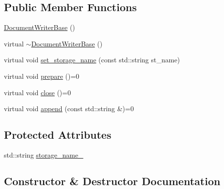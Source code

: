 \subsection*{Public Member Functions}
\begin{DoxyCompactItemize}
\item 
\hyperlink{classGraphicalEditorCore_1_1DocumentWriterBase_af988c894677d39d1544a9b978c327353}{Document\+Writer\+Base} ()
\item 
virtual \hyperlink{classGraphicalEditorCore_1_1DocumentWriterBase_ade9be8e2ae6676e92f6c56cfe1acad11}{$\sim$\+Document\+Writer\+Base} ()
\item 
virtual void \hyperlink{classGraphicalEditorCore_1_1DocumentWriterBase_a225cef356ae9d25a580c5065d5a70a2d}{set\+\_\+storage\+\_\+name} (const std\+::string st\+\_\+name)
\item 
virtual void \hyperlink{classGraphicalEditorCore_1_1DocumentWriterBase_a6ce62d6ccbe39b8c18532c183c6ef4de}{prepare} ()=0
\item 
virtual void \hyperlink{classGraphicalEditorCore_1_1DocumentWriterBase_a852099c87792d7b8a7edf1b4544cb073}{close} ()=0
\item 
virtual void \hyperlink{classGraphicalEditorCore_1_1DocumentWriterBase_a4afe0c1e911f8a6255215f20b372c436}{append} (const std\+::string \&)=0
\end{DoxyCompactItemize}
\subsection*{Protected Attributes}
\begin{DoxyCompactItemize}
\item 
std\+::string \hyperlink{classGraphicalEditorCore_1_1DocumentWriterBase_ae546712e448e7be5f90afac7da766b0d}{storage\+\_\+name\+\_\+}
\end{DoxyCompactItemize}


\subsection{Constructor \& Destructor Documentation}
